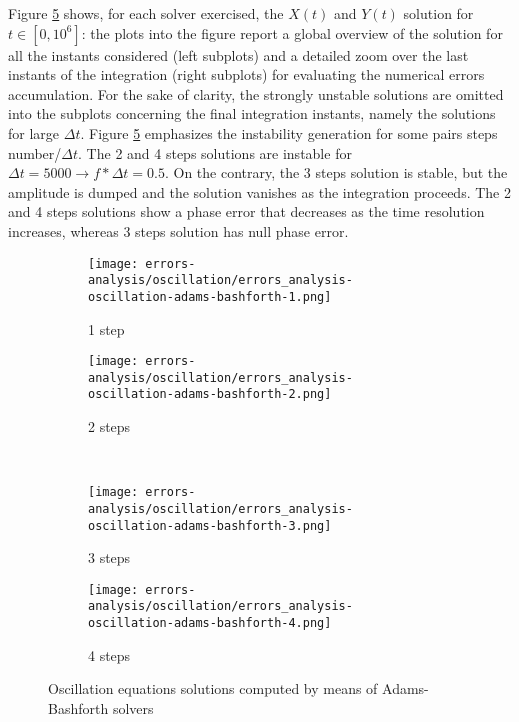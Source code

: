 Figure \ref{fig:results-oscillation-adams-bashforth} shows, for each solver exercised, the $X(t)$ and $Y(t)$ solution for $t \in [0, 10^6]$: the plots into the figure report a global overview of the solution for all the instants considered (left subplots) and a detailed zoom over the last instants of the integration (right subplots) for evaluating the numerical errors accumulation. For the sake of clarity, the strongly unstable solutions are omitted into the subplots concerning the final integration instants, namely the solutions for large $\Delta t$. Figure \ref{fig:results-oscillation-adams-bashforth} emphasizes the instability generation for some pairs steps number/$\Delta t$. The 2 and 4 steps solutions are instable for $\Delta t=5000 \rightarrow f*\Delta t=0.5$. On the contrary, the 3 steps solution is stable, but the amplitude is dumped and the solution vanishes as the integration proceeds. The 2 and 4 steps solutions show a phase error that decreases as the time resolution increases, whereas 3 steps solution has null phase error.

\begin{figure}[!ht]
  \centering
  \begin{subfigure}[b]{0.45\textwidth}
    \centering
    \texttt{[image: errors-analysis/oscillation/errors\_analysis-oscillation-adams-bashforth-1.png]}
    \caption{1 step}\label{fig:results-oscillation-adams-bashforth-1}
  \end{subfigure}\quad%
  \begin{subfigure}[b]{0.45\textwidth}
    \centering
    \texttt{[image: errors-analysis/oscillation/errors\_analysis-oscillation-adams-bashforth-2.png]}
    \caption{2 steps}\label{fig:results-oscillation-adams-bashforth-2}
  \end{subfigure}\\
  \begin{subfigure}[b]{0.45\textwidth}
    \centering
    \texttt{[image: errors-analysis/oscillation/errors\_analysis-oscillation-adams-bashforth-3.png]}
    \caption{3 steps}\label{fig:results-oscillation-adams-bashforth-3}
  \end{subfigure}\quad%
  \begin{subfigure}[b]{0.45\textwidth}
    \centering
    \texttt{[image: errors-analysis/oscillation/errors\_analysis-oscillation-adams-bashforth-4.png]}
    \caption{4 steps}\label{fig:results-oscillation-adams-bashforth-4}
  \end{subfigure}
  \caption{Oscillation equations solutions computed by means of Adams-Bashforth solvers}\label{fig:results-oscillation-adams-bashforth}
\end{figure}

